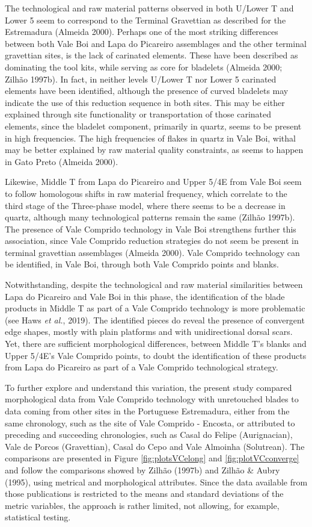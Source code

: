 \documentclass[12pt,twoside]{reedthesis}
\begin{document}
The technological and raw material patterns observed in both U/Lower T and Lower 5 seem to correspond to the Terminal Gravettian as described for the Estremadura (Almeida 2000). Perhaps one of the most striking differences between both Vale Boi and Lapa do Picareiro assemblages and the other terminal gravettian sites, is the lack of carinated elements. These have been described as dominating the tool kits, while serving as core for bladelets (Almeida 2000; Zilhão 1997b). In fact, in neither levels U/Lower T nor Lower 5 carinated elements have been identified, although the presence of curved bladelets may indicate the use of this reduction sequence in both sites. This may be either explained through site functionality or transportation of those carinated elements, since the bladelet component, primarily in quartz, seems to be present in high frequencies. The high frequencies of flakes in quartz in Vale Boi, withal may be better explained by raw material quality constraints, as seems to happen in Gato Preto (Almeida 2000).

Likewise, Middle T from Lapa do Picareiro and Upper 5/4E from Vale Boi seem to follow homologous shifts in raw material frequency, which correlate to the third stage of the Three-phase model, where there seems to be a decrease in quartz, although many technological patterns remain the same (Zilhão 1997b). The presence of Vale Comprido technology in Vale Boi strengthens further this association, since Vale Comprido reduction strategies do not seem be present in terminal gravettian assemblages (Almeida 2000). Vale Comprido technology can be identified, in Vale Boi, through both Vale Comprido points and blanks.

Notwithstanding, despite the technological and raw material similarities between Lapa do Picareiro and Vale Boi in this phase, the identification of the blade products in Middle T as part of a Vale Comprido technology is more problematic (see Haws \emph{et al.}, 2019). The identified pieces do reveal the presence of convergent edge shapes, mostly with plain platforms and with unidirectional dorsal scars. Yet, there are sufficient morphological differences, between Middle T's blanks and Upper 5/4E's Vale Comprido points, to doubt the identification of these products from Lapa do Picareiro as part of a Vale Comprido technological strategy.

To further explore and understand this variation, the present study compared morphological data from Vale Comprido technology with unretouched blades to data coming from other sites in the Portuguese Estremadura, either from the same chronology, such as the site of Vale Comprido - Encosta, or attributed to preceding and succeeding chronologies, such as Casal do Felipe (Aurignacian), Vale de Porcos (Gravettian), Casal do Cepo and Vale Almoinha (Solutrean). The comparisons are presented in Figure \ref{fig:plotsVCelong} and \ref{fig:plotVCconverge} and follow the comparisons showed by Zilhão (1997b) and Zilhão \& Aubry (1995), using metrical and morphological attributes. Since the data available from those publications is restricted to the means and standard deviations of the metric variables, the approach is rather limited, not allowing, for example, statistical testing.
\end{document}
